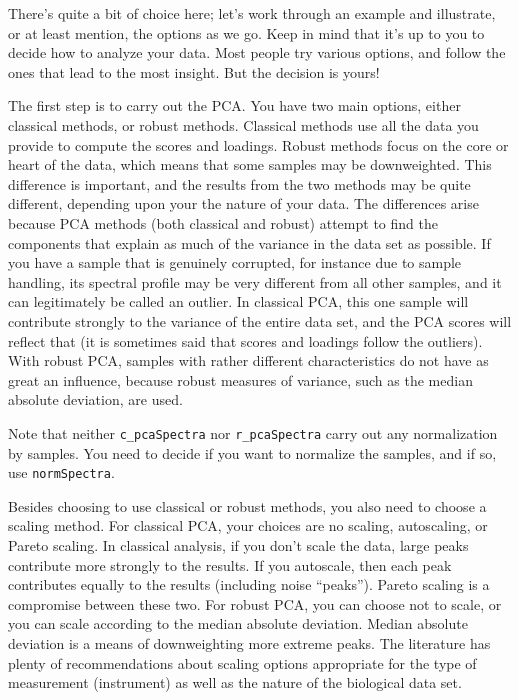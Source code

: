 \documentclass[letter,10pt,twocolumn,twoside,printwatermark=false]{pinp}
\begin{document}
There's quite a bit of choice here; let's work through an example and
illustrate, or at least mention, the options as we go. Keep in mind that
it's up to you to decide how to analyze your data. Most people try
various options, and follow the ones that lead to the most insight. But
the decision is yours!

The first step is to carry out the PCA. You have two main options,
either classical methods, or robust methods. Classical methods use all
the data you provide to compute the scores and loadings. Robust methods
focus on the core or heart of the data, which means that some samples
may be downweighted. This difference is important, and the results from
the two methods may be quite different, depending upon your the nature
of your data. The differences arise because PCA methods (both classical
and robust) attempt to find the components that explain as much of the
variance in the data set as possible. If you have a sample that is
genuinely corrupted, for instance due to sample handling, its spectral
profile may be very different from all other samples, and it can
legitimately be called an outlier. In classical PCA, this one sample
will contribute strongly to the variance of the entire data set, and the
PCA scores will reflect that (it is sometimes said that scores and
loadings follow the outliers). With robust PCA, samples with rather
different characteristics do not have as great an influence, because
robust measures of variance, such as the median absolute deviation, are
used.

Note that neither \texttt{c\_pcaSpectra} nor \texttt{r\_pcaSpectra}
carry out any normalization by samples. You need to decide if you want
to normalize the samples, and if so, use \texttt{normSpectra}.

Besides choosing to use classical or robust methods, you also need to
choose a scaling method. For classical PCA, your choices are no scaling,
autoscaling, or Pareto scaling. In classical analysis, if you don't
scale the data, large peaks contribute more strongly to the results. If
you autoscale, then each peak contributes equally to the results
(including noise ``peaks''). Pareto scaling is a compromise between
these two. For robust PCA, you can choose not to scale, or you can scale
according to the median absolute deviation. Median absolute deviation is
a means of downweighting more extreme peaks. The literature has plenty
of recommendations about scaling options appropriate for the type of
measurement (instrument) as well as the nature of the biological data
set.\citep{Zhang2009, Craig2006, Romano2000, vandenBerg2006, Filzmoser2009, Karakach2009}
\end{document}
